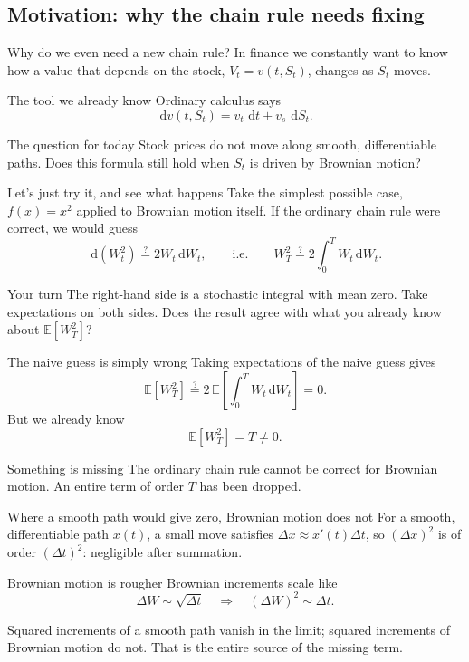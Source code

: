 \documentclass[handout,10pt,aspectratio=169]{beamer}
\newcommand{\E}{\mathbb E}
\newcommand{\dd}{\,\mathrm d}
\begin{document}
\subsection{Motivation: why the chain rule needs fixing}

\begin{frame}{Why do we even need a new chain rule?}
In finance we constantly want to know how a value that depends on the
stock, \(V_t=v(t,S_t)\), changes as \(S_t\) moves.
\begin{block}{The tool we already know}
Ordinary calculus says
\[
\dd v(t,S_t)=v_t\,\dd t+v_s\,\dd S_t.
\]
\end{block}
\begin{alertblock}{The question for today}
Stock prices do not move along smooth, differentiable paths. Does this
formula still hold when \(S_t\) is driven by Brownian motion?
\end{alertblock}
\end{frame}

\begin{frame}{Let's just try it, and see what happens}
Take the simplest possible case, \(f(x)=x^2\) applied to Brownian motion
itself. If the ordinary chain rule were correct, we would guess
\[
\dd(W_t^2)\overset{?}{=}2W_t\dd W_t,
\qquad\text{i.e.}\qquad
W_T^2\overset{?}{=}2\int_0^T W_t\dd W_t.
\]
\begin{block}{Your turn}
The right-hand side is a stochastic integral with mean zero. Take
expectations on both sides. Does the result agree with what you already
know about \(\E[W_T^2]\)?
\end{block}
\end{frame}

\begin{frame}{The naive guess is simply wrong}
Taking expectations of the naive guess gives
\[
\E[W_T^2]\overset{?}{=}2\,\E\!\left[\int_0^TW_t\dd W_t\right]=0.
\]
But we already know
\[
\boxed{\E[W_T^2]=T\neq0.}
\]
\begin{alertblock}{Something is missing}
The ordinary chain rule cannot be correct for Brownian motion. An entire
term of order \(T\) has been dropped.
\end{alertblock}
\end{frame}

\begin{frame}{Where a smooth path would give zero, Brownian motion does not}
For a smooth, differentiable path \(x(t)\), a small move satisfies
\(\Delta x\approx x'(t)\Delta t\), so \((\Delta x)^2\) is of order
\((\Delta t)^2\): negligible after summation.
\begin{block}{Brownian motion is rougher}
Brownian increments scale like
\[
\Delta W\sim\sqrt{\Delta t}
\quad\Longrightarrow\quad
(\Delta W)^2\sim\Delta t.
\]
\end{block}
Squared increments of a smooth path vanish in the limit; squared increments
of Brownian motion do not. That is the entire source of the missing term.
\end{frame}
\end{document}
